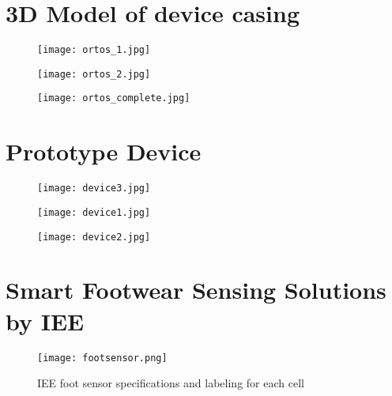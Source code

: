 \chapter{3D Model of device casing}
\makeatletter{}\makeatother
\label{appen:3dmodel}

\begin{figure}[!htb]
  \centering
  \texttt{[image: ortos\_1.jpg]}
  \label{fig:CustomTableLayout}
\end{figure}

\begin{figure}[!htb]
  \centering
  \texttt{[image: ortos\_2.jpg]}
  \label{fig:CustomTableLayout}
\end{figure}

\begin{figure}[!htb]
  \centering
  \texttt{[image: ortos\_complete.jpg]}
  \label{fig:CustomTableLayout}
\end{figure}

\chapter{Prototype Device}
\makeatletter{}\makeatother
\label{appen:prototype}

\begin{figure}[!htb]
  \centering
  \texttt{[image: device3.jpg]}
  \label{fig:CustomTableLayout}
\end{figure}

\begin{figure}[!htb]
  \centering
  \texttt{[image: device1.jpg]}
  \label{fig:CustomTableLayout}
\end{figure}

\begin{figure}[!htb]
  \centering
  \texttt{[image: device2.jpg]}
  \label{fig:CustomTableLayout}
\end{figure}

\chapter{Smart Footwear Sensing Solutions by IEE}
\makeatletter{}\makeatother
\label{appen:footweardevice}

\begin{figure}[!htb]
  \centering
  \texttt{[image: footsensor.png]}
  \caption{IEE foot sensor specifications and labeling for each cell}
  \label{fig:footsensordevice}
\end{figure}
